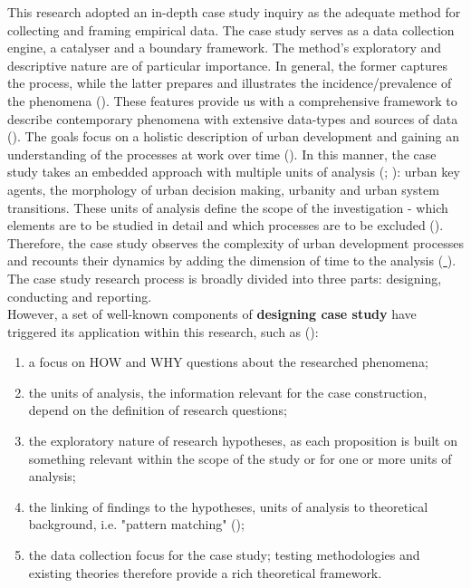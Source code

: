 \documentclass[11pt]{report}
\begin{document}
This research adopted an in-depth case study inquiry as the adequate method for collecting and framing empirical data. The case study serves as a data collection engine, a catalyser and a boundary framework. The method’s exploratory and descriptive nature are of particular importance. In general, the former captures the process, while the latter prepares and illustrates the incidence/prevalence of the phenomena (\href{Yin} {\citealt{yin_applications_2011}}). These features provide us with a comprehensive framework to describe contemporary phenomena with extensive data-types and sources of data (\href{Feagin}{\citealt{feagin_case_1991}}). The goals focus on a holistic description of urban development and gaining an understanding of the processes at work over time (\href{Swanborn}{\citealt{swanborn_case_2010}}). In this manner, the case study takes an embedded approach with multiple units of analysis (\href{Scholz}{\citealt{scholz_embedded_2002}}; \href{Yin} {\citealt{yin_case_2009}}): urban key agents, the morphology of urban decision making, urbanity and urban system transitions. These units of analysis define the scope of the investigation - which elements are to be studied in detail and which processes are to be excluded (\href{Harrison}{\citealt{partington_case_2002}}).
\\

Therefore, the case study observes the complexity of urban development processes and recounts their dynamics by adding the dimension of time to the analysis (\href{Feagin}{ \citealt{feagin_case_1991}}).
The case study research process is broadly divided into three parts: designing, conducting and reporting. 
\\

However, a set of well-known components of \textbf{designing case study} have triggered its application within this research, such as (\href{Yin} {\citealt{yin_case_2009}}):

\begin{enumerate}
\item a focus on HOW and WHY questions about the researched phenomena;
\item the units of analysis, the information relevant for the case construction, depend on the definition of research questions;
\item the exploratory nature of research hypotheses, as each proposition is built on something relevant within the scope of the study or for one or more units of analysis;
\item the linking of findings to the hypotheses, units of analysis to theoretical background, i.e. "pattern matching" (\href{Campbell}{\citealt{campbell_iii.degrees_1975}});
\item the data collection focus for the case study; testing methodologies and existing theories therefore provide a rich theoretical framework.
\end{enumerate}
\end{document}
